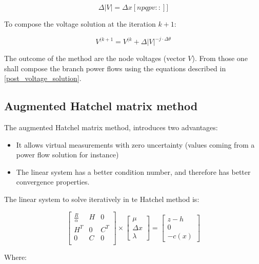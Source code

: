 \documentclass[nols,a4paper,twoside,notoc,fleqn]{tufte-book}
\begin{document}
\begin{equation}
\Delta |{V}| = \Delta {x}[npqpv::]]
\end{equation}

To compose the voltage solution at the iteration $k+1$:

\begin{equation}
{V}^{(k+1} =  {V}^{(k} + \Delta |{V}| ^{-j \cdot \Delta \theta}
\end{equation}

The outcome of the method are the node voltages (vector $V$). From those one shall compose the branch power flows
using the equations described in \ref{post_voltage_solution}.

\subsection{Augmented Hatchel matrix method}

The augmented Hatchel matrix method, introduces two advantages: 
\begin{itemize}
	\item It allows virtual measurements with zero uncertainty (values coming from a power flow solution for instance)
	\item The linear system has a better condition number, and therefore has better convergence properties.
\end{itemize}

The linear system to solve iteratively in te Hatchel method is:

\begin{equation}
\begin{bmatrix}
\frac{R}{\alpha} & H & 0 \\
H^T & 0 & C^T \\
0 & C & 0 \\
\end{bmatrix}
\times
\begin{bmatrix}
\mu\\
\Delta x\\
\lambda
\end{bmatrix}
=
\begin{bmatrix}
z-h\\
0\\
-c(x)
\end{bmatrix}
\end{equation}

Where:
\end{document}
